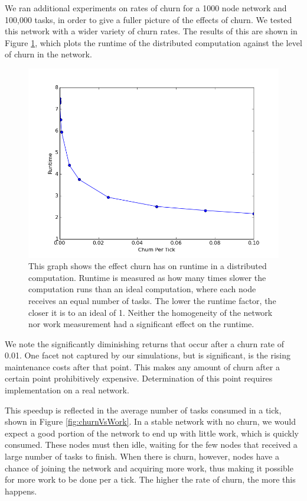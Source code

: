 \documentclass[11pt,conference]{IEEEtran}
\begin{document}
{	
	We ran additional experiments on rates of churn for a 1000 node network and 100,000 tasks, in order to give a fuller picture of the effects of churn.
	We tested this network with a wider variety of churn rates.
	The results of this are shown in Figure \ref{fig:churnVsTime}, which plots the runtime of the distributed computation against the level of churn in the network.
	
	
	\begin{figure}[h]
		\centering
		\includegraphics[width=0.7\linewidth]{figs/churnVsTime}
		\caption[Churn vs Runtime factor]{This graph shows the effect churn has on runtime in a distributed computation.
			Runtime is measured as how many times slower the computation runs than an ideal computation, where each node receives an equal number of tasks.
			The lower the runtime factor, the closer it is to an ideal of 1.
			Neither the homogeneity of the network nor work measurement had a significant effect on the runtime.}
		\label{fig:churnVsTime}
	\end{figure}
	
	We note the significantly diminishing returns that occur after a churn rate of 0.01.
	One facet not captured by our simulations, but is significant, is the rising maintenance costs after that point.
	This makes any amount of churn after a certain point prohibitively expensive.
	Determination of this point requires implementation on a real network.
	
	This speedup is reflected in the average number of tasks consumed in a tick, shown in Figure \ref{fig:churnVsWork}.
	In a stable network with no churn, we would expect a good portion of the network to end up with little work, which is quickly consumed.
	These nodes must then idle, waiting for the few nodes that received a large number of tasks to finish.
	When there is churn, however, nodes have a chance of joining the network and acquiring more work, thus making it possible for more work to be done per a tick.
	The higher the rate of churn, the more this happens.
	
}
\end{document}

